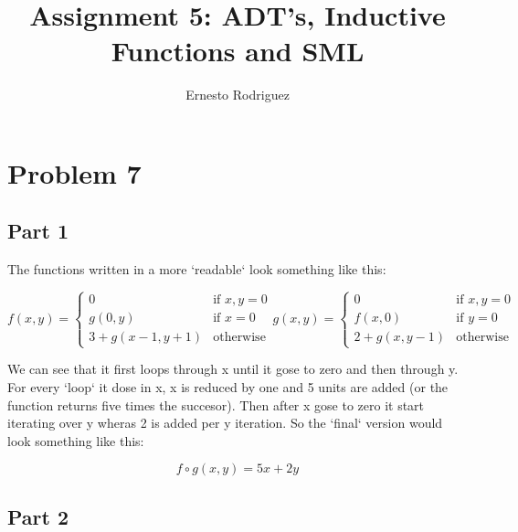 \documentclass{article}
\title{Assignment 5: ADT's, Inductive Functions and SML}
\author{Ernesto Rodriguez}
\begin{document}
\maketitle

\section{Problem 7}

\subsection{Part 1}

The functions written in a more `readable` look something like this:

\[
f(x,y) =
\left\{
	\begin{array}{ll}
		0  & \mbox{if } x,y = 0 \\
		g(0,y) & \mbox{if } x = 0\\
                3+g(x-1,y+1) & \mbox{otherwise}
	\end{array}
\right.
g(x,y) =
\left\{
	\begin{array}{ll}
		0  & \mbox{if } x,y = 0 \\
		f(x,0) & \mbox{if } y = 0\\
                2+g(x,y-1) & \mbox{otherwise}
	\end{array}
\right.
\]

We can see that it first loops through x until it gose to zero and then through y. For every `loop` it dose in x, x is reduced by one and 5 units are added (or the function returns five times the succesor). Then after x gose to zero it start iterating over y wheras 2 is added per y iteration. So the `final` version would look something like this:

\[
f \circ g (x,y)=5x+2y
\]

\subsection{Part 2}
\end{document}
